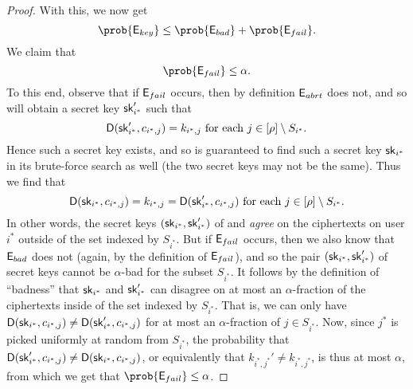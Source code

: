\begin{proof}
  With this, we now get
  \[
    \prob{\eventE_{key}} \le \prob{\eventE_{bad}} + \prob{\eventE_{fail}}.
  \]
  We claim that
  \[
    \prob{\eventE_{fail}} \le \alpha.
  \]
  To this end, observe that if \(\mathsf{E}_{fail}\) occurs,
  then by definition \(\mathsf{E}_{abrt}\) does not, and so
  \redM will obtain a secret key \(\mathsf{sk}_{i^{*}}'\) such that
  \[
    \mathsf{D}(\mathsf{sk}_{i^{*}}',c_{i^{*},j}) = k_{i^{*},j} \text{ for each } j \in [\rho] \setminus S_{i^{*}}.
  \]
  Hence such a secret key exists, and so \advA is guaranteed to find such a secret key \(\mathsf{sk}_{i^{*}}\)
  in its brute-force search as well (the two secret keys may not be the same).
  Thus we find that
  \[
    \mathsf{D}(\mathsf{sk}_{i^{*}},c_{i^{*},j}) = k_{i^{*},j} = \mathsf{D}(\mathsf{sk}_{i^{*}}',c_{i^{*},j}) \text{ for each } j \in [\rho] \setminus S_{i^{*}}.
  \]
  In other words, the secret keys \((\mathsf{sk}_{i^{*}},\mathsf{sk}_{i^{*}}')\)
  of \advA and \redM \emph{agree} on the ciphertexts on user \(i^{*}\) outside of the set indexed by \(S_{i^{*}}\).
  But if \(\mathsf{E}_{fail}\) occurs, then we also know that \(\mathsf{E}_{bad}\) does not
  (again, by the definition of \(\mathsf{E}_{fail}\)),
  and so the pair \((\mathsf{sk}_{i^{*}},\mathsf{sk}_{i^{*}}')\) of secret keys cannot be
  \(\alpha\)-bad for the subset \(S_{i^{*}}\).
  It follows by the definition of ``badness'' that \(\mathsf{sk}_{i^{*}}\) and \(\mathsf{sk}_{i^{*}}'\)
  can disagree on at most an \(\alpha\)-fraction of the ciphertexts inside of the set indexed by \(S_{i^{*}}\).
  That is, we can only have
  \(\mathsf{D}(\mathsf{sk}_{i^{*}},c_{i^{*},j}) \ne \mathsf{D}(\mathsf{sk}_{i^{*}}',c_{i^{*},j})\)
  for at most an \(\alpha\)-fraction of \(j \in S_{i^{*}}\).
  Now, since \(j^{*}\) is picked uniformly at random from \(S_{i^{*}}\),
  the probability that
  \(\mathsf{D}(\mathsf{sk}_{i^{*}}',c_{i^{*},j}) \ne \mathsf{D}(\mathsf{sk}_{i^{*}},c_{i^{*},j})\),
  or equivalently that \(k_{i^{*},j^{*}}' \ne k_{i^{*},j^{*}}\),
  is thus at most \(\alpha\),
  from which we get that \(\prob{\eventE_{fail}} \le \alpha\).


\end{proof}
